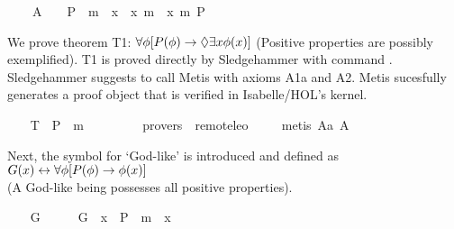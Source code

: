 \begin{isabellebody}
\ \ \ \ A{}{\isacharcolon}\ \ {\isachardoublequoteopen}{\isacharbrackleft}{\isasymforall}{\isacharparenleft}{\isasymlambda}{\isasymPhi}{\isachardot}\ {\isasymforall}{\isacharparenleft}{\isasymlambda}{\isasymPsi}{\isachardot}\ {\isacharparenleft}P\ {\isasymPhi}\ m{\isasymand}\ {\isasymbox}\ {\isacharparenleft}{\isasymforall}{\isacharparenleft}{\isasymlambda}x{\isachardot}\ {\isasymPhi}\ x\ m{\isasymrightarrow}\ {\isasymPsi}\ x{\isacharparenright}{\isacharparenright}{\isacharparenright}\ m{\isasymrightarrow}\ P\ {\isasymPsi}{\isacharparenright}{\isacharparenright}{\isacharbrackright}{\isachardoublequoteclose}%
\begin{isamarkuptext}%
We prove theorem T1: $\forall \phi [P(\phi) \rightarrow \Diamond \exists x \phi(x)]$ (Positive 
properties are possibly exemplified). T1 is proved directly by Sledgehammer with command . 
Sledgehammer suggests to call Metis with axioms A1a and A2. 
Metis sucesfully generates a proof object 
that is verified in Isabelle/HOL's kernel.%
\end{isamarkuptext}%
\isamarkuptrue%
\ \ \isamarkupfalse%
\ T{}{\isacharcolon}\ {\isachardoublequoteopen}{\isacharbrackleft}{\isasymforall}{\isacharparenleft}{\isasymlambda}{\isasymPhi}{\isachardot}\ P\ {\isasymPhi}\ m{\isasymrightarrow}\ {\isasymdiamond}\ {\isacharparenleft}{\isasymexists}\ {\isasymPhi}{\isacharparenright}{\isacharparenright}{\isacharbrackright}{\isachardoublequoteclose}\ \ \isanewline
\ \ \isamarkupfalse%
\ {\isacharbrackleft}provers\ {\isacharequal}\ remote{\isacharunderscore}leo{}{\isacharbrackright}\ \isanewline
%
\isadelimproof
\ \ %
\endisadelimproof
%
\isatagproof
{}\isamarkupfalse%
\ {\isacharparenleft}metis\ A{}a\ A{}{\isacharparenright}%
\endisatagproof
{\isafoldproof}%
%
\isadelimproof
%
\endisadelimproof
%
\begin{isamarkuptext}%
Next, the symbol  for `God-like'  is introduced and defined 
as $G(x) \leftrightarrow \forall \phi [P(\phi) \to \phi(x)]$ \\ (A God-like being possesses 
all positive properties).%
\end{isamarkuptext}%
\isamarkuptrue%
\ \ \isamarkupfalse%
\ G\ {\isacharcolon}{\isacharcolon}\ {\isachardoublequoteopen}{\isasymmu}\ {\isasymRightarrow}\ {\isasymsigma}{\isachardoublequoteclose}\ \ {\isachardoublequoteopen}G\ {\isacharequal}\ {\isacharparenleft}{\isasymlambda}x{\isachardot}\ {\isasymforall}{\isacharparenleft}{\isasymlambda}{\isasymPhi}{\isachardot}\ P\ {\isasymPhi}\ m{\isasymrightarrow}\ {\isasymPhi}\ x{\isacharparenright}{\isacharparenright}{\isachardoublequoteclose}%

\end{isabellebody}
